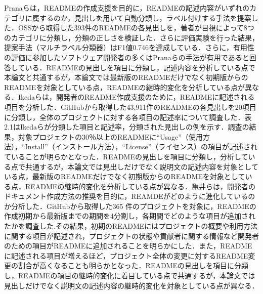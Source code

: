 \documentclass[submit]{ipsj}
\begin{document}
Pranaらは，READMEの作成支援を目的に，READMEの記述内容がいずれのカテゴリに属するのか，見出しを用いて自動分類し，ラベル付けする手法を提案した\cite{prana_README}．OSSから取得した393件のREADMEの各見出しを，著者が目視によって8つのカテゴリに分類し，分類の正しさを検証した．さらに評価実験を行った結果，提案手法（マルチラベル分類器）はF1値0.746を達成している．さらに，有用性の評価に参加したソフトウェア開発者の多くはPranaらの手法が有用であると回答している．READMEの見出しを項目に分類し，記述内容を分析している点で本論文と共通するが，本論文では最新版のREADMEだけでなく初期版からのREADMEを対象としている点，READMEの継時的変化を分析している点が異なる．Ikedaらは，開発者のREADME作成支援のために，READMEに記述される項目を分析した\cite{Ikeda_README}．GitHubから取得した43,911件のREADMEの各見出しを20項目に分類し，全体のプロジェクトに対する各項目の記述率について調査した．表2.1はIkedaらが分類した項目と記述率，分類された見出しの例を示す．調査の結果，対象プロジェクトの30％以上のREADMEに``Usage''（使用方法），``Install''（インストール方法），``License''（ライセンス）の項目が記述されていることが明らかとなった．READMEの見出しを項目に分類し，分析している点で共通するが，本論文では見出しだけでなく説明文の記述内容を対象としている点，最新版のREADMEだけでなく初期版からのREADMEを対象としている点，READMEの継時的変化を分析している点が異なる．亀井らは，開発者のドキュメント作成方法の推奨を目的に，REAMDEがどのように進化しているのか分析した\cite{Kamei_README}．GitHubから取得した365 件のプロジェクトを対象に，READMEの作成初期から最新版までの期間を4分割し，各期間でどのような項目が追加されたかを調査した.その結果，初期のREADMEにはプロジェクトの概要や利用方法に関する項目が記述され，プロジェクトの状態や貢献者に関する情報など開発者のための項目がREADMEに追加されることを明らかにした．また，READMEに記述される項目が増えるほど，プロジェクト全体の変更に対するREADME変更の割合が高くなることも明らかとなった．READMEの見出しを項目に分類し，READMEの項目の継時的変化に着目している点で共通するが，本論文では見出しだけでなく説明文の記述内容の継時的変化を対象としている点が異なる．




\end{document}
